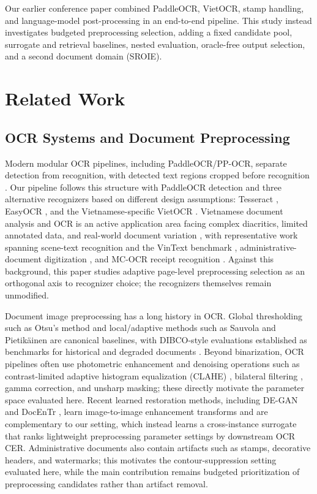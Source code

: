 \documentclass[pdflatex,sn-basic,Numbered,iicol]{sn-jnl}
\begin{document}
Our earlier conference paper \cite{Thanh2025HOCR} combined PaddleOCR, VietOCR, stamp handling, and language-model post-processing in an end-to-end pipeline. This study instead investigates budgeted preprocessing selection, adding a fixed candidate pool, surrogate and retrieval baselines, nested evaluation, oracle-free output selection, and a second document domain (SROIE).

\section{Related Work}
\label{sec:related_work}

\subsection{OCR Systems and Document Preprocessing}

Modern modular OCR pipelines, including PaddleOCR/PP-OCR, separate detection from recognition, with detected text regions cropped before recognition \cite{du2020ppocr,li2022ppocrv3}. Our pipeline follows this structure with PaddleOCR detection and three alternative recognizers based on different design assumptions: Tesseract \cite{smith2007tesseract}, EasyOCR \cite{easyocrsoftware}, and the Vietnamese-specific VietOCR \cite{vietocrsoftware}. Vietnamese document analysis and OCR is an active application area facing complex diacritics, limited annotated data, and real-world document variation \cite{le2025vietnamesedar}, with representative work spanning scene-text recognition and the VinText benchmark \cite{nguyen2021vintext}, administrative-document digitization \cite{nguyen2021digitalization}, and MC-OCR receipt recognition \cite{vu2021mcocr}. Against this background, this paper studies adaptive page-level preprocessing selection as an orthogonal axis to recognizer choice; the recognizers themselves remain unmodified.

Document image preprocessing has a long history in OCR. Global thresholding such as Otsu's method \cite{otsu1979threshold} and local/adaptive methods such as Sauvola and Pietik\"{a}inen \cite{sauvola2000adaptive} are canonical baselines, with DIBCO-style evaluations established as benchmarks for historical and degraded documents \cite{gatos2011dibco}. Beyond binarization, OCR pipelines often use photometric enhancement and denoising operations such as contrast-limited adaptive histogram equalization (CLAHE) \cite{zuiderveld1994clahe}, bilateral filtering \cite{tomasi1998bilateral}, gamma correction, and unsharp masking; these directly motivate the parameter space evaluated here. Recent learned restoration methods, including DE-GAN \cite{souibgui2022degan} and DocEnTr \cite{souibgui2022docentr}, learn image-to-image enhancement transforms and are complementary to our setting, which instead learns a cross-instance surrogate that ranks lightweight preprocessing parameter settings by downstream OCR CER. Administrative documents also contain artifacts such as stamps, decorative headers, and watermarks; this motivates the contour-suppression setting evaluated here, while the main contribution remains budgeted prioritization of preprocessing candidates rather than artifact removal.
\end{document}
